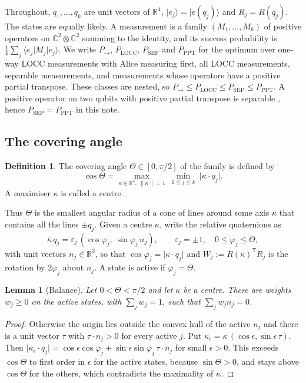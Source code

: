\documentclass[11pt,a4paper]{article}
\newtheorem{lemma}[theorem]{Lemma}
\theoremstyle{definition}
\newtheorem{definition}[theorem]{Definition}
\theoremstyle{plain}
\newcommand{\ket}[1]{\lvert#1\rangle}
\newcommand{\bra}[1]{\langle#1\rvert}
\newcommand{\norm}[1]{\lVert#1\rVert}
\newcommand{\R}{\mathbb{R}}
\newcommand{\T}{\mathsf{T}}
\newcommand{\Pow}{P_{\to}}
\newcommand{\Psep}{P_{\mathrm{SEP}}}
\newcommand{\Plocc}{P_{\mathrm{LOCC}}}
\newcommand{\Pppt}{P_{\mathrm{PPT}}}
\begin{document}
Throughout, $q_1,\dots,q_k$ are unit vectors of $\R^4$, $\ket{e_j}=\ket{e(q_j)}$
and $R_j=R(q_j)$. The states are equally likely. A measurement is a family
$(M_1,\dots,M_k)$ of positive operators on $\mathbb C^2\otimes\mathbb C^2$
summing to the identity, and its success probability is
$\frac1k\sum_j\bra{e_j}M_j\ket{e_j}$. We write $\Pow$, $\Plocc$, $\Psep$ and
$\Pppt$ for the optimum over one-way LOCC measurements with Alice measuring
first, all LOCC measurements, separable measurements, and measurements whose
operators have a positive partial transpose. These classes are nested, so
$\Pow\le\Plocc\le\Psep\le\Pppt$. A positive operator on two qubits with
positive partial transpose is separable \cite{Horodecki1996}, hence
$\Psep=\Pppt$ in this note.

\subsection{The covering angle}
\begin{definition}
The covering angle $\Theta\in[0,\pi/2]$ of the family is defined by
\[
\cos\Theta=\max_{\kappa\in\R^4,\ \norm\kappa=1}\ \min_{1\le j\le k}\ \lvert\kappa\cdot q_j\rvert .
\]
A maximiser $\kappa$ is called a centre.
\end{definition}
Thus $\Theta$ is the smallest angular radius of a cone of lines around some
axis $\kappa$ that contains all the lines $\pm q_j$. Given a centre $\kappa$,
write the relative quaternions as
\[
\bar\kappa\,q_j=\varepsilon_j\,(\cos\varphi_j,\ \sin\varphi_j\,n_j),\qquad
\varepsilon_j=\pm1,\quad 0\le\varphi_j\le\Theta ,
\]
with unit vectors $n_j\in\R^3$, so that $\cos\varphi_j=\lvert\kappa\cdot
q_j\rvert$ and $W_j:=R(\kappa)^\T R_j$ is the rotation by $2\varphi_j$ about
$n_j$. A state is active if $\varphi_j=\Theta$.

\begin{lemma}[Balance]\label{lem:balance}
Let $0<\Theta<\pi/2$ and let $\kappa$ be a centre. There are weights
$w_j\ge0$ on the active states, with $\sum_jw_j=1$, such that
$\sum_jw_jn_j=0$.
\end{lemma}
\begin{proof}
Otherwise the origin lies outside the convex hull of the active $n_j$ and
there is a unit vector $\tau$ with $\tau\cdot n_j>0$ for every active $j$.
Put $\kappa_\epsilon=\kappa\,(\cos\epsilon,\sin\epsilon\,\tau)$. Then
$\lvert\kappa_\epsilon\cdot q_j\rvert=\cos\epsilon\cos\varphi_j
+\sin\epsilon\sin\varphi_j\,\tau\cdot n_j$ for small $\epsilon>0$. This
exceeds $\cos\Theta$ to first order in $\epsilon$ for the active states,
because $\sin\Theta>0$, and stays above $\cos\Theta$ for the others, which
contradicts the maximality of $\kappa$.
\end{proof}
\end{document}

